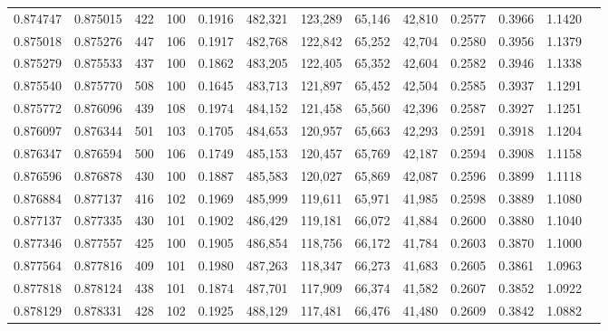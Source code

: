 \begin{tabular}{rrrrrrrrrrrrr}
0.874747 & 0.875015 &   422 & 100 &                                     0.1916 & 482,321 & 123,289 &  65,146 &  42,810 & 0.2577 & 0.3966 & 1.1420 \\
0.875018 & 0.875276 &   447 & 106 &                                     0.1917 & 482,768 & 122,842 &  65,252 &  42,704 & 0.2580 & 0.3956 & 1.1379 \\
0.875279 & 0.875533 &   437 & 100 &                                     0.1862 & 483,205 & 122,405 &  65,352 &  42,604 & 0.2582 & 0.3946 & 1.1338 \\
0.875540 & 0.875770 &   508 & 100 &                                     0.1645 & 483,713 & 121,897 &  65,452 &  42,504 & 0.2585 & 0.3937 & 1.1291 \\
0.875772 & 0.876096 &   439 & 108 &                                     0.1974 & 484,152 & 121,458 &  65,560 &  42,396 & 0.2587 & 0.3927 & 1.1251 \\
0.876097 & 0.876344 &   501 & 103 &                                     0.1705 & 484,653 & 120,957 &  65,663 &  42,293 & 0.2591 & 0.3918 & 1.1204 \\
0.876347 & 0.876594 &   500 & 106 &                                     0.1749 & 485,153 & 120,457 &  65,769 &  42,187 & 0.2594 & 0.3908 & 1.1158 \\
0.876596 & 0.876878 &   430 & 100 &                                     0.1887 & 485,583 & 120,027 &  65,869 &  42,087 & 0.2596 & 0.3899 & 1.1118 \\
0.876884 & 0.877137 &   416 & 102 &                                     0.1969 & 485,999 & 119,611 &  65,971 &  41,985 & 0.2598 & 0.3889 & 1.1080 \\
0.877137 & 0.877335 &   430 & 101 &                                     0.1902 & 486,429 & 119,181 &  66,072 &  41,884 & 0.2600 & 0.3880 & 1.1040 \\
0.877346 & 0.877557 &   425 & 100 &                                     0.1905 & 486,854 & 118,756 &  66,172 &  41,784 & 0.2603 & 0.3870 & 1.1000 \\
0.877564 & 0.877816 &   409 & 101 &                                     0.1980 & 487,263 & 118,347 &  66,273 &  41,683 & 0.2605 & 0.3861 & 1.0963 \\
0.877818 & 0.878124 &   438 & 101 &                                     0.1874 & 487,701 & 117,909 &  66,374 &  41,582 & 0.2607 & 0.3852 & 1.0922 \\
0.878129 & 0.878331 &   428 & 102 &                                     0.1925 & 488,129 & 117,481 &  66,476 &  41,480 & 0.2609 & 0.3842 & 1.0882 \\

\end{tabular}
